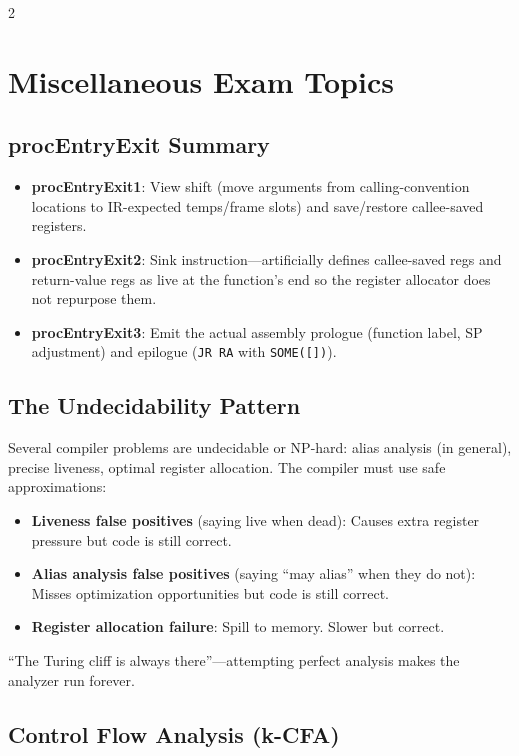 \documentclass[9pt,landscape]{extarticle}
\begin{document}
\begin{multicols}{2}
\section{Miscellaneous Exam Topics}

\subsection{procEntryExit Summary}
\begin{itemize}
  \item \textbf{procEntryExit1}: View shift (move arguments from calling-convention locations to IR-expected temps/frame slots) and save/restore callee-saved registers.
  \item \textbf{procEntryExit2}: Sink instruction---artificially defines callee-saved regs and return-value regs as live at the function's end so the register allocator does not repurpose them.
  \item \textbf{procEntryExit3}: Emit the actual assembly prologue (function label, SP adjustment) and epilogue (\texttt{JR RA} with \texttt{SOME([])}).
\end{itemize}

\subsection{The Undecidability Pattern}

Several compiler problems are undecidable or NP-hard: alias analysis (in general), precise liveness, optimal register allocation. The compiler must use safe approximations:
\begin{itemize}
  \item \textbf{Liveness false positives} (saying live when dead): Causes extra register pressure but code is still correct.
  \item \textbf{Alias analysis false positives} (saying ``may alias'' when they do not): Misses optimization opportunities but code is still correct.
  \item \textbf{Register allocation failure}: Spill to memory. Slower but correct.
\end{itemize}

``The Turing cliff is always there''---attempting perfect analysis makes the analyzer run forever.

\subsection{Control Flow Analysis (k-CFA)}


\end{multicols}
\end{document}
